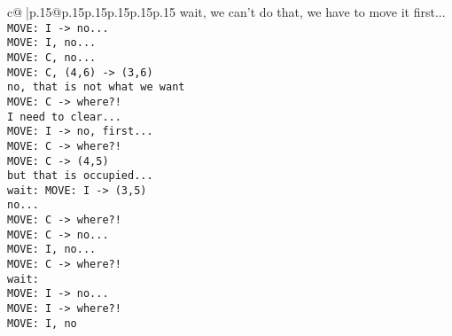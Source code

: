\documentclass{article}
\begin{document}
{\begin{supertabular}{c@{$\;$}|p{.15\linewidth}@{}p{.15\linewidth}p{.15\linewidth}p{.15\linewidth}p{.15\linewidth}p{.15\linewidth}}
{{{  wait, we can't do that, we have to move it first...\\ \tt  MOVE: I -> no...\\ \tt  MOVE: I, no...\\ \tt  MOVE: C, no... \\ \tt  MOVE: C, (4,6) -> (3,6) \\ \tt  no, that is not what we want\\ \tt  MOVE: C -> where?!\\ \tt  I need to clear...\\ \tt  MOVE: I -> no, first...\\ \tt  MOVE: C -> where?!\\ \tt  MOVE: C -> (4,5) \\ \tt  but that is occupied...\\ \tt  wait: MOVE: I -> (3,5) \\ \tt  no... \\ \tt  MOVE: C -> where?!\\ \tt  MOVE: C -> no...\\ \tt  MOVE: I, no...\\ \tt  MOVE: C -> where?!\\ \tt  wait: \\ \tt  MOVE: I -> no...\\ \tt  MOVE: I -> where?!\\ \tt  MOVE: I, no}}}
\end{supertabular}}
\end{document}
